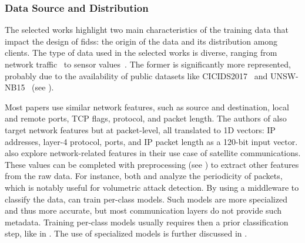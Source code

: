 \begin{table}
  \centering
  \caption{
    Comparative overview of selected works in the original study---approach and objectives (1/2).%
    \label{tbl:sota.comp}%
  }%
  \resizebox{\textwidth}{!}{}
\end{table}



\subsubsection{Data Source and Distribution\label{sec:sota.quali.data}}

The selected works highlight two main characteristics of the training data that impact the design of \glspl{fids}: the origin of the data and its distribution among clients.
The type of data used in the selected works is diverse, ranging from network traffic~\cite{chen_Networkanomalydetection_2020,rathore_BlockSecIoTNetBlockchainbaseddecentralized_2019} to sensor values~\cite{zhang_BlockchainbasedFederatedLearning_2020,schneble_Attackdetectionusing_2019}.
The former is significantly more represented, probably due to the availability of public datasets like CICIDS2017~\cite{sharafaldin_GeneratingNewIntrusion_2018} and UNSW-NB15~\cite{moustafa_UNSWNB15comprehensivedata_2015} (see ).

Most papers \cite{chen_Networkanomalydetection_2020,rathore_BlockSecIoTNetBlockchainbaseddecentralized_2019,nguyen_DIoTFederatedSelflearning_2019,li_DeepFedFederatedDeep_2020,rahman_InternetThingsIntrusion_2020,sun_IntrusionDetectionSegmented_2020,popoola_FederatedDeepLearning_2021a,hei_trustedfeatureaggregator_2020} use similar network features, such as source and destination, local and remote ports, TCP flags, protocol, and packet length.
The authors of \cite{qin_LineSpeedScalableIntrusion_2020a} also target network features but at packet-level, all translated to 1D vectors: IP addresses, layer-4 protocol, ports, and IP packet length as a 120-bit input vector.
\textcite{li_DeepFedFederatedDeep_2020} also explore network-related features in their use case of satellite communications.
These values can be completed with preprocessing (see ) to extract other features from the raw data.
For instance, both \textcite{pahl_AllEyesYou_2018} and \textcite{nguyen_DIoTFederatedSelflearning_2019} analyze the periodicity of packets, which is notably useful for volumetric attack detection.
By using a middleware to classify the data, \textcite{pahl_AllEyesYou_2018} can train per-class models.
Such models are more specialized and thus more accurate, but most communication layers do not provide such metadata.
Training per-class models usually requires then a prior classification step, like in \cite{nguyen_DIoTFederatedSelflearning_2019}.
The use of specialized models is further discussed in .

